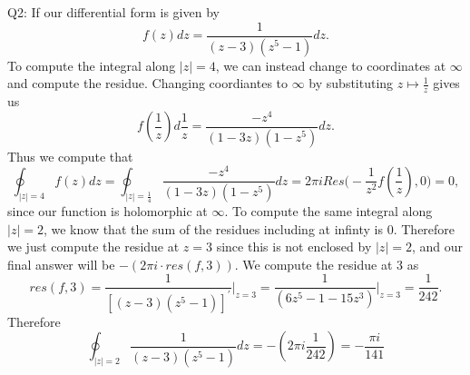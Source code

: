 \documentclass[letterpaper]{article}
\begin{document}
 \noindent  Q2: If our differential form is given by $$f(z)dz = \frac{1}{(z-3)(z^5-1)}dz.$$
To compute the integral along $|z|=4$, we can instead change to coordinates at $\infty$ and compute the residue. 
Changing coordiantes to $\infty$ by substituting $z\mapsto \frac{1}{z}$ gives us $$f(\frac{1}{z}) d\frac{1}{z} = \frac{-z^4}{(1-3z)(1-z^5)}dz.$$
Thus we compute that $$\oint_{|z| = 4} f(z)dz = \oint_{|z| = \frac{1}{4}} \frac{-z^4}{(1-3z)(1-z^5)}dz = 2\pi i Res\Big(- \frac{1}{z^2} f(\frac{1}{z}), 0 \Big) = 0,$$
since our function is holomorphic at $\infty$.  To compute the same integral along $|z|=2$, we know that the sum of the residues including at infinty is $0$. Therefore we just compute the residue at $z=3$ since this is not
enclosed by $|z|=2$, and our final answer will be $-(2\pi i \cdot res(f,3))$. We compute the residue at $3$ as $$res(f,3) = \frac{1}{ [ (z-3)(z^5-1) ]^\prime } \Big|_{z=3} = \frac{1}{(6z^5-1-15z^3)}\Big|_{z=3} = \frac{1}{242}.$$
Therefore $$\oint_{|z|=2} \frac{1}{(z-3)(z^5-1)}dz = -(2\pi i \frac{1}{242}) = - \frac{\pi i}{141}$$
\end{document}
